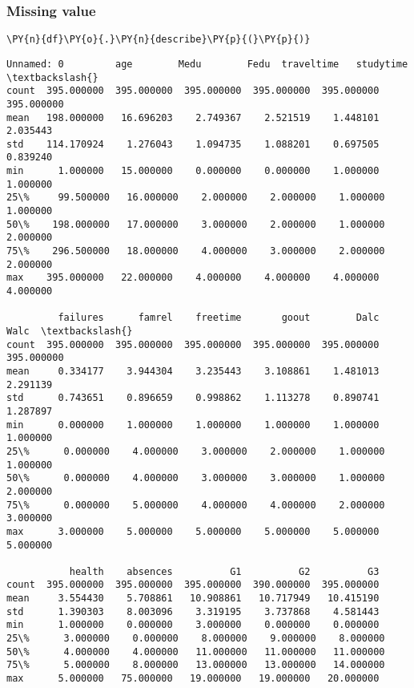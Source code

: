     \hypertarget{missing-value}{%
\subsubsection{Missing value}\label{missing-value}}

    \begin{tcolorbox}[breakable, size=fbox, boxrule=1pt, pad at break*=1mm,colback=cellbackground, colframe=cellborder]
\begin{Verbatim}[commandchars=\\\{\}]
\PY{n}{df}\PY{o}{.}\PY{n}{describe}\PY{p}{(}\PY{p}{)}
\end{Verbatim}
\end{tcolorbox}

            \begin{tcolorbox}[breakable, size=fbox, boxrule=.5pt, pad at break*=1mm, opacityfill=0]
\begin{Verbatim}[commandchars=\\\{\}]
       Unnamed: 0         age        Medu        Fedu  traveltime   studytime  \textbackslash{}
count  395.000000  395.000000  395.000000  395.000000  395.000000  395.000000
mean   198.000000   16.696203    2.749367    2.521519    1.448101    2.035443
std    114.170924    1.276043    1.094735    1.088201    0.697505    0.839240
min      1.000000   15.000000    0.000000    0.000000    1.000000    1.000000
25\%     99.500000   16.000000    2.000000    2.000000    1.000000    1.000000
50\%    198.000000   17.000000    3.000000    2.000000    1.000000    2.000000
75\%    296.500000   18.000000    4.000000    3.000000    2.000000    2.000000
max    395.000000   22.000000    4.000000    4.000000    4.000000    4.000000

         failures      famrel    freetime       goout        Dalc        Walc  \textbackslash{}
count  395.000000  395.000000  395.000000  395.000000  395.000000  395.000000
mean     0.334177    3.944304    3.235443    3.108861    1.481013    2.291139
std      0.743651    0.896659    0.998862    1.113278    0.890741    1.287897
min      0.000000    1.000000    1.000000    1.000000    1.000000    1.000000
25\%      0.000000    4.000000    3.000000    2.000000    1.000000    1.000000
50\%      0.000000    4.000000    3.000000    3.000000    1.000000    2.000000
75\%      0.000000    5.000000    4.000000    4.000000    2.000000    3.000000
max      3.000000    5.000000    5.000000    5.000000    5.000000    5.000000

           health    absences          G1          G2          G3
count  395.000000  395.000000  395.000000  390.000000  395.000000
mean     3.554430    5.708861   10.908861   10.717949   10.415190
std      1.390303    8.003096    3.319195    3.737868    4.581443
min      1.000000    0.000000    3.000000    0.000000    0.000000
25\%      3.000000    0.000000    8.000000    9.000000    8.000000
50\%      4.000000    4.000000   11.000000   11.000000   11.000000
75\%      5.000000    8.000000   13.000000   13.000000   14.000000
max      5.000000   75.000000   19.000000   19.000000   20.000000
\end{Verbatim}
\end{tcolorbox}
        
